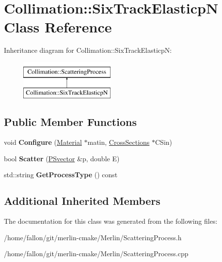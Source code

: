 \hypertarget{classCollimation_1_1SixTrackElasticpN}{}\section{Collimation\+:\+:Six\+Track\+ElasticpN Class Reference}
\label{classCollimation_1_1SixTrackElasticpN}
Inheritance diagram for Collimation\+:\+:Six\+Track\+ElasticpN\+:\begin{figure}[H]
\begin{center}
\leavevmode
\includegraphics[height=2.000000cm]{classCollimation_1_1SixTrackElasticpN}
\end{center}
\end{figure}
\subsection*{Public Member Functions}
\begin{DoxyCompactItemize}
\item 
\mbox{\label{classCollimation_1_1SixTrackElasticpN_afc1fd11050f43369f11394cb3be2a957}} 
void {\bfseries Configure} (\hyperlink{classMaterial}{Material} $\ast$matin, \hyperlink{classCollimation_1_1CrossSections}{Cross\+Sections} $\ast$C\+Sin)
\item 
\mbox{\label{classCollimation_1_1SixTrackElasticpN_a54920a5ca138f4ed2f6a71bc408e52b2}} 
bool {\bfseries Scatter} (\hyperlink{classPSvector}{P\+Svector} \&p, double E)
\item 
\mbox{\label{classCollimation_1_1SixTrackElasticpN_a88a9e2e8ca528e3315322acbda64c736}} 
std\+::string {\bfseries Get\+Process\+Type} () const
\end{DoxyCompactItemize}
\subsection*{Additional Inherited Members}


The documentation for this class was generated from the following files\+:\begin{DoxyCompactItemize}
\item 
/home/fallon/git/merlin-\/cmake/\+Merlin/Scattering\+Process.\+h\item 
/home/fallon/git/merlin-\/cmake/\+Merlin/Scattering\+Process.\+cpp\end{DoxyCompactItemize}

